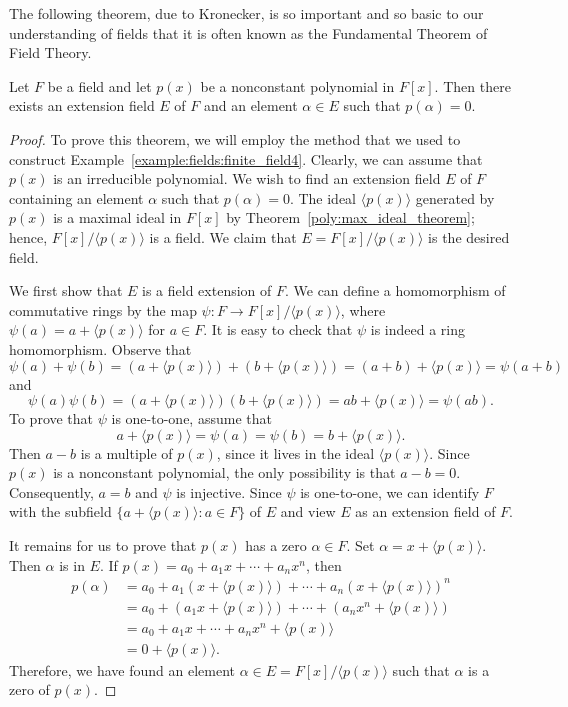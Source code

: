 The following theorem, due to Kronecker, is so important and so basic 
to our understanding of fields that it is often known as the
Fundamental Theorem of Field Theory.
 

\begin{theorem}\label{fields:ext_exist_theorem}
Let $F$ be a field and let $p(x)$ be a nonconstant polynomial in
$F[x]$.  Then there exists an extension field $E$ of $F$ and an 
element $\alpha \in E$ such that $p(\alpha) = 0$. 
\end{theorem}
 

\begin{proof}
To prove this theorem, we will employ the method that we used to
construct Example~\ref{example:fields:finite_field4}. Clearly, we can assume that $p(x)$ is an
irreducible polynomial. We wish to find an extension field $E$ of $F$
containing an element $\alpha$ such that $p(\alpha) = 0$. The ideal
$\langle p(x) \rangle$ generated by $p(x)$ is a maximal ideal in
$F[x]$ by Theorem~\ref{poly:max_ideal_theorem}; hence, $F[x]/\langle p(x) \rangle$ is a
field. We claim that $E = F[x]/\langle p(x) \rangle$ is the desired 
field.  


We first show that $E$ is a field extension of $F$. We can define a
homomorphism of commutative rings by the map
\mbox{$\psi:F \rightarrow F[x]/\langle p(x) \rangle$}, where $\psi(a) = a +
\langle p(x)\rangle$ for $a \in F$. It is easy to check that $\psi$ is
indeed a ring homomorphism.  Observe that 
\[
\psi( a ) + \psi( b ) = (a + \langle p(x) \rangle) + (b + \langle p(x)
\rangle) = (a + b) + \langle p(x) \rangle = \psi( a + b ) 
\]
and
\[
\psi( a )  \psi( b ) = (a  + \langle p(x) \rangle)  (b + \langle p(x)
\rangle) = a  b  + \langle p(x) \rangle = \psi( a  b ). 
\]
To prove that $\psi$ is one-to-one, assume that
\[
a + \langle p(x) \rangle = \psi(a) = \psi(b) = b + \langle p(x)
\rangle. 
\]
Then \mbox{$a - b$} is a multiple of $p(x)$, since it lives in the
ideal $\langle p(x) \rangle$. Since $p(x)$ is a nonconstant
polynomial, the only possibility is that \mbox{$a - b = 0$}.
Consequently, $a = b$ and $\psi$ is injective. Since $\psi$ is
one-to-one, we can identify $F$ with the subfield $\{ a + \langle p(x)
\rangle : a \in F \}$ of $E$ and view $E$ as an extension field of $F$.
 

It remains for us to prove that $p(x)$ has a zero $\alpha \in F$. Set
$\alpha = x + \langle p(x) \rangle$. Then $\alpha$ is in $E$. If $p(x) =
a_0 + a_1 x + \cdots + a_n x^n$, then
\begin{align*}
p( \alpha )
& = 
a_0 + a_1( x + \langle p(x) \rangle) + \cdots + a_n ( x + \langle p(x)
\rangle)^n \\
& = 
a_0 + ( a_1 x + \langle p(x) \rangle) + \cdots + (a_n  x^n + \langle p(x)
\rangle) \\
& = 
a_0 + a_1 x + \cdots + a_n x^n + \langle p(x) \rangle \\
& = 
0 + \langle p(x) \rangle.
\end{align*}
Therefore, we have found an element $\alpha \in E = F[x]/\langle p(x)
\rangle$ such that $\alpha$ is a zero of $p(x)$.
\end{proof}
 


